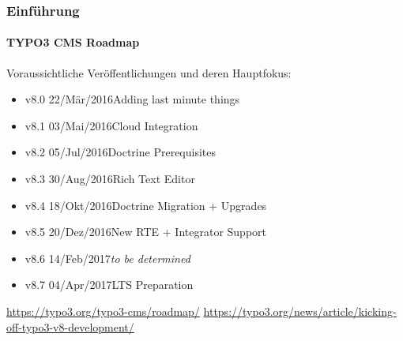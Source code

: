 \begin{frame}[fragile]
	\frametitle{Einführung}
	\framesubtitle{TYPO3 CMS Roadmap}

	Voraussichtliche Veröffentlichungen und deren Hauptfokus:

	\begin{itemize}

		\item v8.0 \tabto{1.1cm}22/Mär/2016\tabto{3.4cm}Adding last minute things
		\item v8.1 \tabto{1.1cm}03/Mai/2016\tabto{3.4cm}Cloud Integration
		\item v8.2 \tabto{1.1cm}05/Jul/2016\tabto{3.4cm}Doctrine Prerequisites
		\item v8.3 \tabto{1.1cm}30/Aug/2016\tabto{3.4cm}Rich Text Editor
		\item
			\begingroup
				\color{typo3orange}
					v8.4 \tabto{1.1cm}18/Okt/2016\tabto{3.4cm}Doctrine Migration + Upgrades
			\endgroup
		\item v8.5 \tabto{1.1cm}20/Dez/2016\tabto{3.4cm}New RTE + Integrator Support
		\item v8.6 \tabto{1.1cm}14/Feb/2017\tabto{3.4cm}\textit{to be determined}
		\item v8.7 \tabto{1.1cm}04/Apr/2017\tabto{3.4cm}LTS Preparation

	\end{itemize}

	\smaller
		\url{https://typo3.org/typo3-cms/roadmap/}\newline
		\url{https://typo3.org/news/article/kicking-off-typo3-v8-development/}
	\normalsize

\end{frame}

